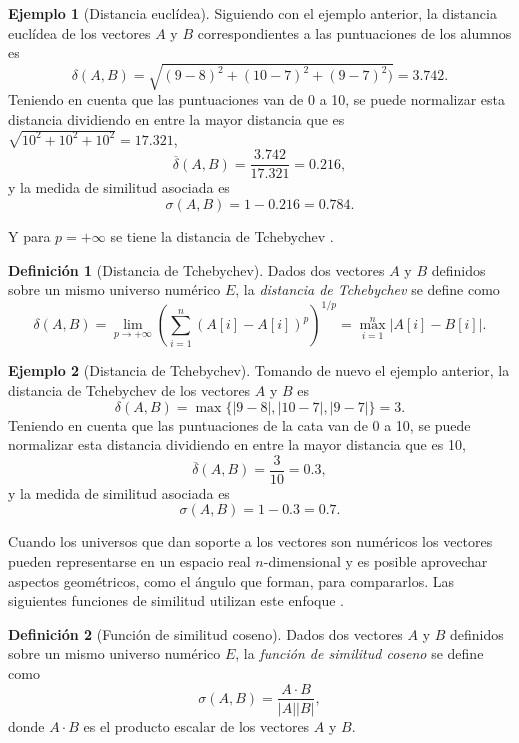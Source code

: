 \documentclass[a4paper,10pt,twoside]{article}
\theoremstyle{definition}
\newtheorem{definition}{Definición}
\newtheorem{example}{Ejemplo}
\begin{document}
\begin{example}[Distancia euclídea]\label{def:sim-euclidea}
Siguiendo con el ejemplo anterior, la distancia euclídea de los vectores $A$ y $B$ correspondientes a las puntuaciones de los alumnos es
\[
\delta(A,B) = \sqrt{(9-8)^2+(10-7)^2+(9-7)^2)}= 3.742.
\]
Teniendo en cuenta que las puntuaciones van de 0 a 10, se puede normalizar esta distancia dividiendo en entre la mayor distancia que es $\sqrt{10^2+10^2+10^2}=17.321$,
\[
\overline\delta(A,B) = \frac{3.742}{17.321}=0.216,
\]
y la medida de similitud asociada es 
\[
\sigma(A,B) = 1-0.216=0.784.
\]
\end{example}

Y para $p=+\infty$ se tiene la distancia de Tchebychev \cite{deza2009encyclopedia}.

\begin{definition}[Distancia de Tchebychev]
Dados dos vectores $A$ y $B$ definidos sobre un mismo universo numérico $E$, la \emph{distancia de Tchebychev} se define como
\[
\delta(A,B)=\lim_{p\rightarrow +\infty}\left(\sum_{i=1}^{n}(A[i]-A[i])^p\right)^{1/p}=\max_{i=1}^{n}|A[i]-B[i]|.
\]
\end{definition}

\begin{example}[Distancia de Tchebychev]
Tomando de nuevo el ejemplo anterior, la distancia de Tchebychev de los vectores $A$ y $B$ es
\[
\delta(A,B) = \max\{|9-8|,|10-7|,|9-7|\}= 3.
\]
Teniendo en cuenta que las puntuaciones de la cata van de 0 a 10, se puede normalizar esta distancia dividiendo en entre la mayor distancia que es 10,
\[
\overline\delta(A,B) = \frac{3}{10}=0.3,
\]
y la medida de similitud asociada es 
\[
\sigma(A,B) = 1-0.3=0.7.
\]
\end{example}

Cuando los universos que dan soporte a los vectores son numéricos los vectores pueden representarse en un espacio real $n$-dimensional y es posible aprovechar aspectos geométricos, como el ángulo que forman, para compararlos.
Las siguientes funciones de similitud utilizan este enfoque \cite{deza2009encyclopedia}.

\begin{definition}[Función de similitud coseno]
Dados dos vectores $A$ y $B$ definidos sobre un mismo universo numérico $E$, la \emph{función de similitud coseno} se define como
\[
\sigma(A,B)=\frac{A\cdot B}{|A||B|},
\]
donde $A\cdot B$ es el producto escalar de los vectores $A$ y $B$.
\end{definition}
\end{document}

